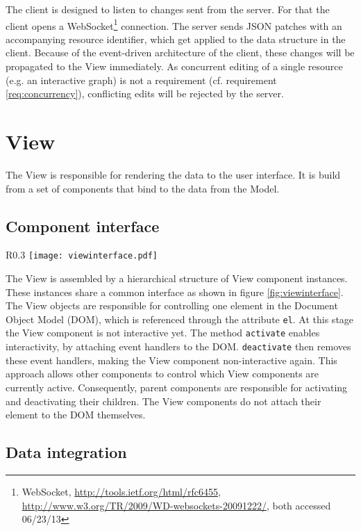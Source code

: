 The client is designed to listen to changes sent from the server. For that the client opens a WebSocket\footnote{WebSocket, \url{http://tools.ietf.org/html/rfc6455}, \url{http://www.w3.org/TR/2009/WD-websockets-20091222/}, both accessed 06/23/13} connection. The server sends JSON patches with an accompanying resource identifier, which get applied to the data structure in the client. Because of the event-driven architecture of the client, these changes will be propagated to the View immediately. As concurrent editing of a single resource (e.g. an interactive graph) is not a requirement (cf. requirement \ref{req:concurrency}), conflicting edits will be rejected by the server.

\section{View}

The View is responsible for rendering the data to the user interface. It is build from a set of components that bind to the data from the Model.

\subsection{Component interface}

\begin{wrapfigure}{R}{0.3\textwidth}
\texttt{[image: viewinterface.pdf]}
\caption{Class diagram of the View component interface}
\label{fig:viewinterface}
\end{wrapfigure}

The View is assembled by a hierarchical structure of View component instances. These instances share a common interface as shown in figure \ref{fig:viewinterface}. The View objects are responsible for controlling one element in the Document Object Model (DOM), which is referenced through the attribute \texttt{el}. At this stage the View component is not interactive yet. The method \texttt{activate} enables interactivity, by attaching event handlers to the DOM. \texttt{deactivate} then removes these event handlers, making the View component non-interactive again. This approach allows other components to control which View components are currently active. Consequently, parent components are responsible for activating and deactivating their children. The View components do not attach their element to the DOM themselves.

\subsection{Data integration}

